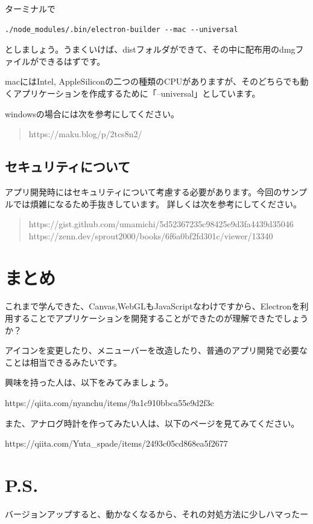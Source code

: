\documentclass[mingoth,11pt,a4j,uplatex]{jsarticle}
\begin{document}
ターミナルで
\begin{verbatim}
./node_modules/.bin/electron-builder --mac --universal
\end{verbatim}
としましょう。うまくいけば、distフォルダができて、その中に配布用のdmgファイルができるはずです。

macにはIntel, AppleSiliconの二つの種類のCPUがありますが、そのどちらでも動くアプリケーションを作成するために「--universal」としています。

windowsの場合には次を参考にしてください。
\begin{quote}
https://maku.blog/p/2tcs8n2/
\end{quote}

\subsection{セキュリティについて}
アプリ開発時にはセキュリティについて考慮する必要があります。今回のサンプルでは煩雑になるため手抜きしています。
詳しくは次を参考にしてください。
\begin{quote}
https://gist.github.com/umamichi/5d52367235c98425e9d3fa4439d35046\\
https://zenn.dev/sprout2000/books/6f6a0bf2fd301c/viewer/13340
\end{quote}

\section{まとめ}
これまで学んできた、Canvas,WebGLもJavaScriptなわけですから、Electronを利用することでアプリケーションを開発することができたのが理解できたでしょうか？

\vspace{1em}
アイコンを変更したり、メニューバーを改造したり、普通のアプリ開発で必要なことは相当できるみたいです。

興味を持った人は、以下をみてみましょう。

https://qiita.com/nyanchu/items/9a1c910bbca55e9d2f3c

また、アナログ時計を作ってみたい人は、以下のページを見てみてください。

https://qiita.com/Yuta\_spade/items/2493c05cd868ea5f2677

\section*{P.S.}
バージョンアップすると、動かなくなるから、それの対処方法に少しハマったー


\end{document}
